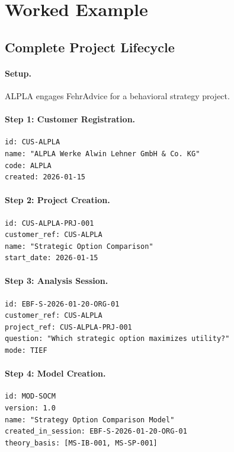 \section{Worked Example}
\label{sec:superkey-example}

\subsection{Complete Project Lifecycle}

\paragraph{Setup.} ALPLA engages FehrAdvice for a behavioral strategy project.

\paragraph{Step 1: Customer Registration.}
\begin{verbatim}
id: CUS-ALPLA
name: "ALPLA Werke Alwin Lehner GmbH & Co. KG"
code: ALPLA
created: 2026-01-15
\end{verbatim}

\paragraph{Step 2: Project Creation.}
\begin{verbatim}
id: CUS-ALPLA-PRJ-001
customer_ref: CUS-ALPLA
name: "Strategic Option Comparison"
start_date: 2026-01-15
\end{verbatim}

\paragraph{Step 3: Analysis Session.}
\begin{verbatim}
id: EBF-S-2026-01-20-ORG-01
customer_ref: CUS-ALPLA
project_ref: CUS-ALPLA-PRJ-001
question: "Which strategic option maximizes utility?"
mode: TIEF
\end{verbatim}

\paragraph{Step 4: Model Creation.}
\begin{verbatim}
id: MOD-SOCM
version: 1.0
name: "Strategy Option Comparison Model"
created_in_session: EBF-S-2026-01-20-ORG-01
theory_basis: [MS-IB-001, MS-SP-001]
\end{verbatim}

